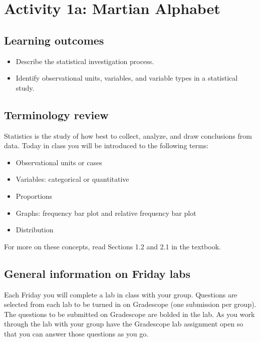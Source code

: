 \documentclass[
]{report}
\begin{document}
\newpage

\hypertarget{activity-1a-martian-alphabet}{%
\section{Activity 1a: Martian Alphabet}\label{activity-1a-martian-alphabet}}


\hypertarget{learning-outcomes}{%
\subsection{Learning outcomes}\label{learning-outcomes}}

\begin{itemize}
\item
  Describe the statistical investigation process.
\item
  Identify observational units, variables, and variable types in a statistical study.
\end{itemize}

\hypertarget{terminology-review}{%
\subsection{Terminology review}\label{terminology-review}}

Statistics is the study of how best to collect, analyze, and draw conclusions from data. Today in class you will be introduced to the following terms:

\begin{itemize}
\item
  Observational units or cases
\item
  Variables: categorical or quantitative
\item
  Proportions
\item
  Graphs: frequency bar plot and relative frequency bar plot
\item
  Distribution
\end{itemize}

For more on these concepts, read Sections 1.2 and 2.1 in the textbook.

\hypertarget{general-information-on-friday-labs}{%
\subsection{General information on Friday labs}\label{general-information-on-friday-labs}}

Each Friday you will complete a lab in class with your group. Questions are selected from each lab to be turned in on Gradescope (one submission per group). The questions to be submitted on Gradescope are bolded in the lab. As you work through the lab with your group have the Gradescope lab assignment open so that you can answer those questions as you go.
\end{document}
